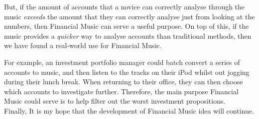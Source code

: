 But, if the amount of accounts that a novice can correctly analyse through the music \textit{exceeds} the amount that they can correctly analyse just from looking at the numbers, then Financial Music can serve a useful purpose. On top of this, if the music provides a \textit{quicker} way to analyse accounts than traditional methods, then we have found a real-world use for Financial Music.

For example, an investment portfolio manager could batch convert a series of accounts to music, and then listen to the tracks on their iPod whilst out jogging during their lunch break. When returning to their office, they can then choose which accounts to investigate further. Therefore, the main purpose Financial Music could serve is to help filter out the worst investment propositions. \\

\noindent Finally, It is my hope that the development of Financial Music idea will continue.




